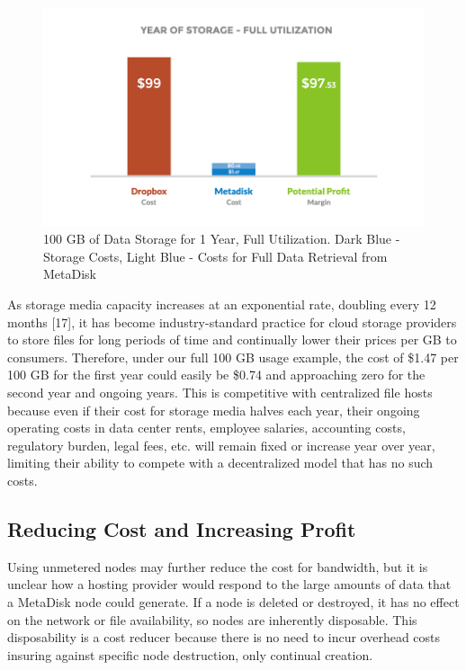 \documentclass[a4paper,10pt]{article}
\begin{document}
\begin{figure}[h!]
  \centering
      \includegraphics[width=\linewidth]{04}
  \caption{100 GB of Data Storage for 1 Year, Full Utilization. Dark Blue - Storage Costs, Light Blue - Costs for Full Data Retrieval from MetaDisk}
\end{figure}


As storage media capacity increases at an exponential rate, doubling every 12 months [17], it has become industry-standard practice for cloud storage providers to store files for long periods of time and continually lower their prices per GB to consumers. Therefore, under our full 100 GB usage example, the cost of \$1.47 per 100 GB for the first year could easily be \$0.74 and approaching zero for the second year and ongoing years. This is competitive with centralized file hosts because even if their cost for storage media halves each year, their ongoing operating costs in data center rents, employee salaries, accounting costs, regulatory burden, legal fees, etc. will remain fixed or increase year over year, limiting their ability to compete with a decentralized model that has no such costs.

\subsection{Reducing Cost and Increasing Profit}

Using unmetered nodes may further reduce the cost for bandwidth, but it is unclear how a hosting provider would respond to the large amounts of data that a MetaDisk node could generate. If a node is deleted or destroyed, it has no effect on the network or file availability, so nodes are inherently disposable. This disposability is a cost reducer because there is no need to incur overhead costs insuring against specific node destruction, only continual creation.  \\
\end{document}

